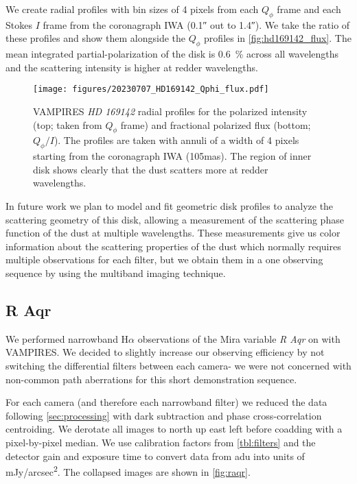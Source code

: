 We create radial profiles with bin sizes of 4 pixels from each $Q_\phi$ frame and each Stokes $I$ frame from the coronagraph IWA (\ang{;;0.1} out to \ang{;;1.4}). We take the ratio of these profiles and show them alongside the $Q_\phi$ profiles in \autoref{fig:hd169142_flux}. The mean integrated partial-polarization of the disk is \SI{0.6}{\%} across all wavelengths and the scattering intensity is higher at redder wavelengths. 

\begin{figure}
    \centering
    \texttt{[image: figures/20230707\_HD169142\_Qphi\_flux.pdf]}
    \caption{ VAMPIRES \textit{HD 169142} radial profiles for the polarized intensity (top; taken from $Q_\phi$ frame) and fractional polarized flux (bottom; $Q_\phi/I$). The profiles are taken with annuli of a width of 4 pixels starting from the coronagraph IWA (\si{105}{mas}). The region of inner disk shows clearly that the dust scatters more at redder wavelengths.\label{fig:hd169142_flux}}
\end{figure}

In future work we plan to model and fit geometric disk profiles to analyze the scattering geometry of this disk, allowing a measurement of the scattering phase function of the dust at multiple wavelengths. These measurements give us color information about the scattering properties of the dust which normally requires multiple observations for each filter, but we obtain them in a one observing sequence by using the multiband imaging technique.

\subsection{R Aqr\label{sec:raqr}}

We performed narrowband H$\alpha$ observations of the Mira variable \textit{R Aqr} on  with VAMPIRES. We decided to slightly increase our observing efficiency by not switching the differential filters between each camera- we were not concerned with non-common path aberrations for this short demonstration sequence.

For each camera (and therefore each narrowband filter) we reduced the data following \autoref{sec:processing} with dark subtraction and phase cross-correlation centroiding. We derotate all images to north up east left before coadding with a pixel-by-pixel median. We use calibration factors from \autoref{tbl:filters} and the detector gain and exposure time to convert data from \si{adu} into units of \si{mJy/arcsec^2}. The collapsed images are shown in \autoref{fig:raqr}.

